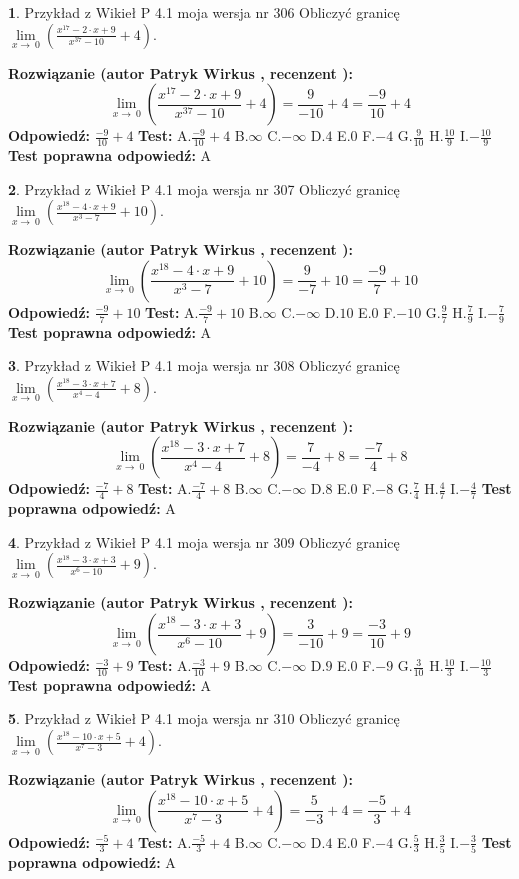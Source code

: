 \documentclass[12pt, a4paper]{article}
\theoremstyle{definition} %
\newtheorem{zad}{}
\newcommand{\zadStart}[1]{\begin{zad}#1\newline}
\newcommand{\zadStop}{\end{zad}}
\newcommand{\rozwStart}[2]{\noindent \textbf{Rozwiązanie (autor #1 , recenzent #2): }\newline}
\newcommand{\rozwStop}{\newline}
\newcommand{\odpStart}{\noindent \textbf{Odpowiedź:}\newline}
\newcommand{\odpStop}{\newline}
\newcommand{\testStart}{\noindent \textbf{Test:}\newline}
\newcommand{\testStop}{\newline}
\newcommand{\kluczStart}{\noindent \textbf{Test poprawna odpowiedź:}\newline}
\newcommand{\kluczStop}{\newline}
\begin{document}
\zadStart{Przykład z Wikieł P 4.1 moja wersja nr 306}
Obliczyć granicę $\lim\limits_{x\to\ 0}(\frac{x^{17}-2 \cdot x +9}{x^{37}-10}+4)$.
\zadStop
\rozwStart{Patryk Wirkus}{}
$$\lim\limits_{x\to\ 0}(\frac{x^{17}-2 \cdot x +9}{x^{37}-10}+4)=\frac{9}{-10}+4=\frac{-9}{10}+4$$
\rozwStop
\odpStart
$\frac{-9}{10}+4$
\odpStop
\testStart
A.$\frac{-9}{10}+4$
B.$\infty$
C.$-\infty$
D.$4$
E.$0$
F.$-4$
G.$\frac{9}{10}$
H.$\frac{10}{9}$
I.$-\frac{10}{9}$
\testStop
\kluczStart
A
\kluczStop



\zadStart{Przykład z Wikieł P 4.1 moja wersja nr 307}
Obliczyć granicę $\lim\limits_{x\to\ 0}(\frac{x^{18}-4 \cdot x +9}{x^{3}-7}+10)$.
\zadStop
\rozwStart{Patryk Wirkus}{}
$$\lim\limits_{x\to\ 0}(\frac{x^{18}-4 \cdot x +9}{x^{3}-7}+10)=\frac{9}{-7}+10=\frac{-9}{7}+10$$
\rozwStop
\odpStart
$\frac{-9}{7}+10$
\odpStop
\testStart
A.$\frac{-9}{7}+10$
B.$\infty$
C.$-\infty$
D.$10$
E.$0$
F.$-10$
G.$\frac{9}{7}$
H.$\frac{7}{9}$
I.$-\frac{7}{9}$
\testStop
\kluczStart
A
\kluczStop



\zadStart{Przykład z Wikieł P 4.1 moja wersja nr 308}
Obliczyć granicę $\lim\limits_{x\to\ 0}(\frac{x^{18}-3 \cdot x +7}{x^{4}-4}+8)$.
\zadStop
\rozwStart{Patryk Wirkus}{}
$$\lim\limits_{x\to\ 0}(\frac{x^{18}-3 \cdot x +7}{x^{4}-4}+8)=\frac{7}{-4}+8=\frac{-7}{4}+8$$
\rozwStop
\odpStart
$\frac{-7}{4}+8$
\odpStop
\testStart
A.$\frac{-7}{4}+8$
B.$\infty$
C.$-\infty$
D.$8$
E.$0$
F.$-8$
G.$\frac{7}{4}$
H.$\frac{4}{7}$
I.$-\frac{4}{7}$
\testStop
\kluczStart
A
\kluczStop



\zadStart{Przykład z Wikieł P 4.1 moja wersja nr 309}
Obliczyć granicę $\lim\limits_{x\to\ 0}(\frac{x^{18}-3 \cdot x +3}{x^{6}-10}+9)$.
\zadStop
\rozwStart{Patryk Wirkus}{}
$$\lim\limits_{x\to\ 0}(\frac{x^{18}-3 \cdot x +3}{x^{6}-10}+9)=\frac{3}{-10}+9=\frac{-3}{10}+9$$
\rozwStop
\odpStart
$\frac{-3}{10}+9$
\odpStop
\testStart
A.$\frac{-3}{10}+9$
B.$\infty$
C.$-\infty$
D.$9$
E.$0$
F.$-9$
G.$\frac{3}{10}$
H.$\frac{10}{3}$
I.$-\frac{10}{3}$
\testStop
\kluczStart
A
\kluczStop



\zadStart{Przykład z Wikieł P 4.1 moja wersja nr 310}
Obliczyć granicę $\lim\limits_{x\to\ 0}(\frac{x^{18}-10 \cdot x +5}{x^{7}-3}+4)$.
\zadStop
\rozwStart{Patryk Wirkus}{}
$$\lim\limits_{x\to\ 0}(\frac{x^{18}-10 \cdot x +5}{x^{7}-3}+4)=\frac{5}{-3}+4=\frac{-5}{3}+4$$
\rozwStop
\odpStart
$\frac{-5}{3}+4$
\odpStop
\testStart
A.$\frac{-5}{3}+4$
B.$\infty$
C.$-\infty$
D.$4$
E.$0$
F.$-4$
G.$\frac{5}{3}$
H.$\frac{3}{5}$
I.$-\frac{3}{5}$
\testStop
\kluczStart
A
\kluczStop
\end{document}
